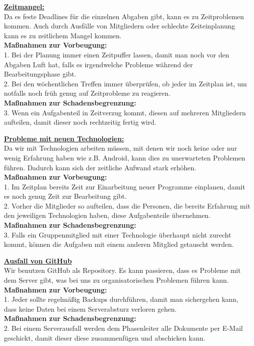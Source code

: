 \documentclass[fontsize=12pt,paper=a4,twoside]{scrartcl}
\begin{document}
\textbf{\underline{Zeitmangel:}}\\
Da es feste Deadlines für die einzelnen Abgaben gibt, kann es zu Zeitproblemen kommen. Auch durch Ausfälle von Mitgliedern oder schlechte Zeiteinplanung kann es zu zeitlichem Mangel kommen.\\
\textbf{Maßnahmen zur Vorbeugung:}\\
1. Bei der Planung immer einen Zeitpuffer lassen, damit man noch vor den Abgaben Luft hat, falls es irgendwelche Probleme während der Bearbeitungsphase gibt.\\
2. Bei den wöchentlichen Treffen immer überprüfen, ob jeder im Zeitplan ist, um notfalls noch früh genug auf Zeitprobleme zu reagieren.\\
\textbf{Maßnahmen zur Schadensbegrenzung:}\\
3. Wenn ein Aufgabenteil in Zeitverzug kommt, diesen auf mehreren Mitgliedern aufteilen, damit dieser noch rechtzeitig fertig wird.\\

\bigskip

\textbf{\underline{Probleme mit neuen Technologien:}}\\
Da wir mit Technologien arbeiten müssen, mit denen wir noch keine oder nur wenig Erfahrung haben wie z.B. Android, kann dies zu unerwarteten Problemen führen. Dadurch kann sich der zeitliche Aufwand stark erhöhen.\\
\textbf{Maßnahmen zur Vorbeugung:}\\
1. Im Zeitplan bereits Zeit zur Einarbeitung neuer Programme einplanen, damit es noch genug Zeit zur Bearbeitung gibt.\\
2. Vorher die Mitglieder so aufteilen, dass die Personen, die bereits Erfahrung mit den jeweiligen Technologien haben, diese Aufgabenteile übernehmen.\\
\textbf{Maßnahmen zur Schadensbegrenzung:}\\
3. Falls ein Gruppenmitglied mit einer Technologie überhaupt nicht zurecht kommt, können die Aufgaben mit einem anderen Mitglied getauscht werden.\\

\bigskip

\textbf{\underline{Ausfall von GitHub}}\\
Wir benutzen GitHub als Repository. Es kann passieren, dass es Probleme mit dem Server gibt, was bei uns zu organisatorischen Problemen führen kann.
\textbf{Maßnahmen zur Vorbeugung:}\\
1. Jeder sollte regelmäßig Backups durchführen, damit man sichergehen kann, dass keine Daten bei einem Serverabsturz verloren gehen.\\
\textbf{Maßnahmen zur Schadensbegrenzung:}\\
2. Bei einem Serverausfall werden dem Phasenleiter alle Dokumente per E-Mail geschickt, damit dieser diese zusammenfügen und abschicken kann.\\
\end{document}
